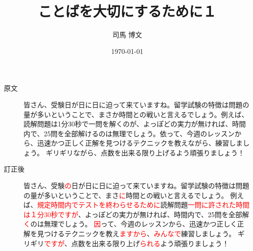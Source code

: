 \documentclass[uplatex, 12pt, dvipdfmx]{jsarticle}
\title{ことばを大切にするために１}
\author{司馬 博文}
\date{\today}
\begin{document}
\maketitle

\begin{description}
    \item[原文] 皆さん、受験日が日に日に迫って来ていますね。留学試験の特徴は問題の量が多いということで、まさか時間との戦いと言えるでしょう。例えば、読解問題は1分30秒で一問を解くのが、よっぽどの実力が無ければ、時間内で、25問を全部解けるのは無理でしょう。依って、今週のレッスンから、迅速かつ正しく正解を見つけるテクニックを教えながら、練習しましょう。
    ギリギリながら、点数を出来る限り上げるよう頑張りましょう！
    \item[訂正後] 皆さん、受験\textcolor{red}{の}日が日に日に迫って来ていますね。留学試験の特徴は問題の量が多いということで、まさ\textcolor{red}{に}時間との戦いと言えるでしょう。
    例えば、\textcolor{red}{規定時間内でテストを終わらせるために}読解問題\textcolor{red}{一問に許された時間は１分30秒ですが}、よっぽどの実力が無ければ、時間内で、25問を全部解\textcolor{red}{く}のは無理でしょう。
    \textcolor{red}{因}って、今週のレッスンから、迅速かつ正しく正解を見つけるテクニックを教え\textcolor{red}{ますから}、\textcolor{red}{みんなで}練習しましょう。
    ギリギリ\textcolor{red}{ですが}、点数を出来る限り上げ\textcolor{red}{られる}よう頑張りましょう！
\end{description}
\end{document}
